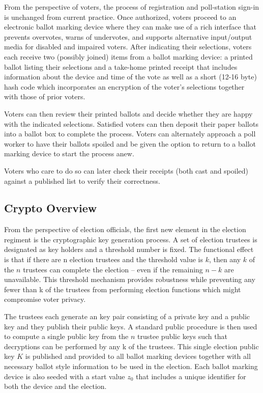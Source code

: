 \label{sec:design}

From the perspective of voters, the process of registration and poll-station sign-in is unchanged from current practice.  Once authorized, voters proceed to an electronic ballot marking device where they can make use of a rich interface that prevents overvotes, warns of undervotes, and supports alternative input/output media for disabled and impaired voters.  After indicating their selections, voters each receive two (possibly joined) items from a ballot marking device:  a printed ballot listing their selections and a take-home printed receipt that includes information about the device and time of the vote as well as a short (12-16 byte) hash code which incorporates an encryption of the voter's selections together with those of prior voters.

Voters can then review their printed ballots and decide whether they are happy with the indicated selections.  Satisfied voters can then deposit their paper ballots into a ballot box to complete the process.  Voters can alternately approach a poll worker to have their ballots spoiled and be given the option to return to a ballot marking device to start the process anew.

Voters who care to do so can later check their receipts (both cast and spoiled) against a published list to verify their correctness.

\subsection{Crypto Overview}
From the perspective of election officials, the first new element in the election regiment is the cryptographic key generation process.  A set of election trustees is designated as key holders and a threshold number is fixed.  The functional effect is that if there are n election trustees and the threshold value is $k$, then any $k$ of the $n$ trustees can complete the election – even if the remaining $n-k$ are unavailable.  This threshold mechanism provides robustness while preventing any fewer than k of the trustees from performing election functions which might compromise voter privacy.

The trustees each generate an \elgamal key pair consisting of a private key and a public key and they publish their public keys.  A standard public procedure is then used to compute a single \elgamal  public key from the $n$ trustee public keys such that decryptions can be performed by any k of the trustees.  This single \elgamal election public key $K$ is published and provided to all ballot marking devices together with all necessary ballot style information to be used in the election.  Each ballot marking device is also seeded with a start value $z_0$ that includes a unique identifier for both the device and the election.

